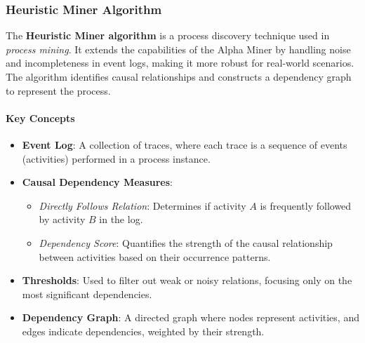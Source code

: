 \subsubsection{Heuristic Miner Algorithm}

The \textbf{Heuristic Miner algorithm} is a process discovery technique used in \textit{process mining}. It extends the capabilities of the Alpha Miner by handling noise and incompleteness in event logs, making it more robust for real-world scenarios. The algorithm identifies causal relationships and constructs a dependency graph to represent the process.

\paragraph{Key Concepts}
\begin{itemize}
    \item \textbf{Event Log}: A collection of traces, where each trace is a sequence of events (activities) performed in a process instance.
    \item \textbf{Causal Dependency Measures}:
    \begin{itemize}
        \item \textit{Directly Follows Relation}: Determines if activity $A$ is frequently followed by activity $B$ in the log.
        \item \textit{Dependency Score}: Quantifies the strength of the causal relationship between activities based on their occurrence patterns.
    \end{itemize}
    \item \textbf{Thresholds}: Used to filter out weak or noisy relations, focusing only on the most significant dependencies.
    \item \textbf{Dependency Graph}: A directed graph where nodes represent activities, and edges indicate dependencies, weighted by their strength.
\end{itemize}


